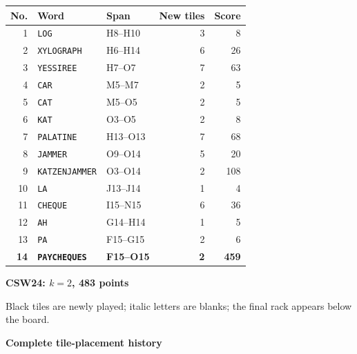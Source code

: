 \documentclass[letterpaper]{article}
\begin{document}
\begin{center}
\fontsize{8.5}{8.8}\selectfont
\setlength{\tabcolsep}{4pt}
\renewcommand{\arraystretch}{0.90}
\begin{tabular}{@{}rllrr@{}}\toprule
No. & Word & Span & New tiles & Score\\
\midrule
1 & \texttt{LOG} & H8--H10 & 3 & 8\\
2 & \texttt{XYLOGRAPH} & H6--H14 & 6 & 26\\
3 & \texttt{YESSIREE} & H7--O7 & 7 & 63\\
4 & \texttt{CAR} & M5--M7 & 2 & 5\\
5 & \texttt{CAT} & M5--O5 & 2 & 5\\
6 & \texttt{KAT} & O3--O5 & 2 & 8\\
7 & \texttt{PALATINE} & H13--O13 & 7 & 68\\
8 & \texttt{JAMMER} & O9--O14 & 5 & 20\\
9 & \texttt{KATZENJAMMER} & O3--O14 & 2 & 108\\
10 & \texttt{LA} & J13--J14 & 1 & 4\\
11 & \texttt{CHEQUE} & I15--N15 & 6 & 36\\
12 & \texttt{AH} & G14--H14 & 1 & 5\\
13 & \texttt{PA} & F15--G15 & 2 & 6\\
\midrule
\textbf{14} & \textbf{\texttt{PAYCHEQUES}} & \textbf{F15--O15} & \textbf{2} & \textbf{459}\\
\bottomrule\end{tabular}
\end{center}
\vfill
\clearpage
\begin{center}
{\fontsize{11}{12}\selectfont\bfseries CSW24: $k=2$, 483 points\par}
\vspace{2pt}
\par
\vspace{1pt}
{\fontsize{7.2}{8}\selectfont Black tiles are newly played; italic letters are blanks; the final rack appears below the board.\par}
\vspace{2pt}
{\fontsize{8.5}{9}\selectfont\bfseries Complete tile-placement history\par}
\end{center}
\end{document}
